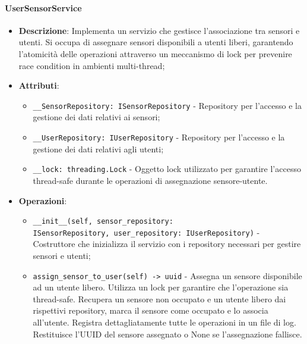 \documentclass[10pt]{article}
\begin{document}
    \paragraph{UserSensorService}
    \begin{itemize} 
    \item \textbf{Descrizione}: Implementa un servizio che gestisce l'associazione tra sensori e utenti. Si occupa di assegnare sensori disponibili a utenti liberi, garantendo l'atomicità delle operazioni attraverso un meccanismo di lock per prevenire race condition in ambienti multi-thread;
    \item \textbf{Attributi}:
    \begin{itemize}
        \item \texttt{\_\_SensorRepository: ISensorRepository} - Repository per l'accesso e la gestione dei dati relativi ai sensori;
        \item \texttt{\_\_UserRepository: IUserRepository} - Repository per l'accesso e la gestione dei dati relativi agli utenti;
        \item \texttt{\_\_lock: threading.Lock} - Oggetto lock utilizzato per garantire l'accesso thread-safe durante le operazioni di assegnazione sensore-utente.
    \end{itemize}
    
    \item \textbf{Operazioni}:
    \begin{itemize}
        \item \texttt{\_\_init\_\_(self, sensor\_repository:\\ ISensorRepository, user\_repository: IUserRepository)} - Costruttore che inizializza il servizio con i repository necessari per gestire sensori e utenti;
        
        \item \texttt{assign\_sensor\_to\_user(self) -> uuid} - Assegna un sensore disponibile ad un utente libero. Utilizza un lock per garantire che l'operazione sia thread-safe. Recupera un sensore non occupato e un utente libero dai rispettivi repository, marca il sensore come occupato e lo associa all'utente. Registra dettagliatamente tutte le operazioni in un file di log. Restituisce l'UUID del sensore assegnato o None se l'assegnazione fallisce.
    \end{itemize}
    \end{itemize}
\end{document}
